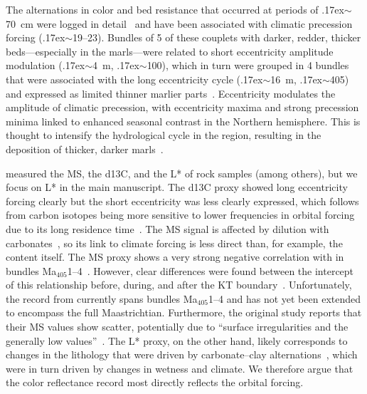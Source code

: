 \documentclass[draft]{agujournal2019}
\newcommand{\appr}{\raise.17ex\hbox{\(\scriptstyle\sim\)}} %
\newcommand{\ma}[1]{Ma\(_{405}\)#1} %
\begin{document}
The alternations in color and bed resistance that occurred at periods of \appr\qty{70}{\cm} were logged in detail~\cite{Batenburg2012,Dinares-Turell2013}
and have been associated with climatic precession forcing (\appr\qtyrange{19}{23}{\kiloyear}).
Bundles of 5 of these couplets with darker, redder, thicker beds---especially in the marls---were related to short eccentricity amplitude modulation (\appr\qty{4}{\metre}, \appr\qty{100}{\kiloyear}),
which in turn were grouped in 4 bundles that were associated with the long eccentricity cycle (\appr\qty{16}{\metre}, \appr\qty{405}{\kiloyear}) and expressed as limited thinner marlier parts~\cite{Batenburg2012,Batenburg2014}.
Eccentricity modulates the amplitude of climatic precession,
with eccentricity maxima and strong precession minima linked to enhanced seasonal contrast in the Northern hemisphere.
This is thought to intensify the hydrological cycle in the region, resulting in the deposition of thicker, darker marls~\cite{Batenburg2014}.

 measured the \gls{MS}, the \gls{d13C}, and the \gls{L*} of rock samples (among others), but we focus on \gls{L*} in the main manuscript.
The \gls{d13C} proxy showed long eccentricity forcing clearly but the short eccentricity was less clearly expressed,
which follows from carbon isotopes being more sensitive to lower frequencies in orbital forcing due to its long residence time~\cite{Zeebe2017,Kocken2019loscar}.
The \gls{MS} signal is affected by dilution with carbonates~\cite{tenKateSprenger1993}, so its link to climate forcing is less direct than, for example, the  content itself.
The \gls{MS} proxy shows a very strong negative correlation with  in bundles \ma{1--4}~\cite{tenKateSprenger1993,Gilabert2022}.
However, clear differences were found between the intercept of this relationship before, during, and after the \gls{KT} boundary~\cite<supplementary figure S2 in>{Gilaberg2022}.
Unfortunately, the  record from  currently spans bundles \ma{1--4} and has not yet been extended to encompass the full Maastrichtian.
Furthermore, the original study reports that their \gls{MS} values show scatter, potentially due to ``surface irregularities and the generally low values''~\cite{Batenburg2012}.
The \gls{L*} proxy, on the other hand, likely corresponds to changes in the lithology that were driven by carbonate--clay alternations~\cite{MountWard1986,Batenburg2012},
which were in turn driven by changes in wetness and climate.
We therefore argue that the color reflectance record most directly reflects the orbital forcing.
\end{document}
